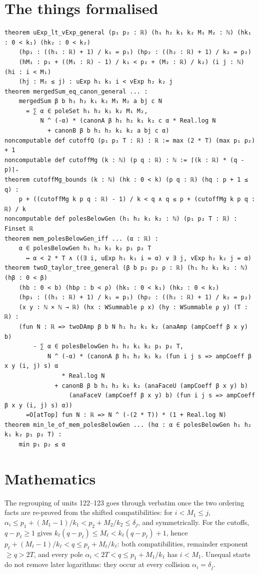 \documentclass[11pt]{article}
\begin{document}
\section{The things formalised}
{\small
\begin{verbatim}
theorem uExp_lt_vExp_general (p₁ p₂ : ℝ) (h₁ h₂ k₁ k₂ M₁ M₂ : ℕ) (hk₁ : 0 < k₁) (hk₂ : 0 < k₂)
    (hp₁ : ((h₁ : ℝ) + 1) / k₁ = p₁) (hp₂ : ((h₂ : ℝ) + 1) / k₂ = p₂)
    (hM₁ : p₁ + ((M₁ : ℝ) - 1) / k₁ < p₂ + (M₂ : ℝ) / k₂) (i j : ℕ) (hi : i < M₁)
    (hj : M₂ ≤ j) : uExp h₁ k₁ i < vExp h₂ k₂ j
theorem mergedSum_eq_canon_general ... :
    mergedSum β b h₁ h₂ k₁ k₂ M₁ M₂ a bj c N
      = ∑ α ∈ poleSet h₁ h₂ k₁ k₂ M₁ M₂,
          N ^ (-α) * (canonA β h₁ h₂ k₁ k₂ c α * Real.log N
            + canonB β b h₁ h₂ k₁ k₂ a bj c α)
noncomputable def cutoffQ (p₁ p₂ T : ℝ) : ℝ := max (2 * T) (max p₁ p₂) + 1
noncomputable def cutoffMg (k : ℕ) (p q : ℝ) : ℕ := ⌈(k : ℝ) * (q - p)⌉₊
theorem cutoffMg_bounds (k : ℕ) (hk : 0 < k) (p q : ℝ) (hq : p + 1 ≤ q) :
    p + ((cutoffMg k p q : ℝ) - 1) / k < q ∧ q ≤ p + (cutoffMg k p q : ℝ) / k
noncomputable def polesBelowGen (h₁ h₂ k₁ k₂ : ℕ) (p₁ p₂ T : ℝ) : Finset ℝ
theorem mem_polesBelowGen_iff ... (α : ℝ) :
    α ∈ polesBelowGen h₁ h₂ k₁ k₂ p₁ p₂ T
      ↔ α < 2 * T ∧ ((∃ i, uExp h₁ k₁ i = α) ∨ ∃ j, vExp h₂ k₂ j = α)
theorem twoD_taylor_tree_general (β b p₁ p₂ ρ : ℝ) (h₁ h₂ k₁ k₂ : ℕ) (hβ : 0 < β)
    (hb : 0 < b) (hbρ : b < ρ) (hk₁ : 0 < k₁) (hk₂ : 0 < k₂)
    (hp₁ : ((h₁ : ℝ) + 1) / k₁ = p₁) (hp₂ : ((h₂ : ℝ) + 1) / k₂ = p₂)
    (x y : ℕ × ℕ → ℝ) (hx : WSummable ρ x) (hy : WSummable ρ y) (T : ℝ) :
    (fun N : ℝ => twoDAmp β b N h₁ h₂ k₁ k₂ (anaAmp (ampCoeff β x y) b)
        - ∑ α ∈ polesBelowGen h₁ h₂ k₁ k₂ p₁ p₂ T,
            N ^ (-α) * (canonA β h₁ h₂ k₁ k₂ (fun i j s => ampCoeff β x y (i, j) s) α
                * Real.log N
              + canonB β b h₁ h₂ k₁ k₂ (anaFaceU (ampCoeff β x y) b)
                  (anaFaceV (ampCoeff β x y) b) (fun i j s => ampCoeff β x y (i, j) s) α))
      =O[atTop] fun N : ℝ => N ^ (-(2 * T)) * (1 + Real.log N)
theorem min_le_of_mem_polesBelowGen ... (hα : α ∈ polesBelowGen h₁ h₂ k₁ k₂ p₁ p₂ T) :
    min p₁ p₂ ≤ α
\end{verbatim}
}

\section{Mathematics}

The regrouping of units 122--123 goes through verbatim once the two ordering facts are re-proved
from the shifted compatibilities: for $i<M_1\le j$, $\alpha_i\le p_1+(M_1-1)/k_1<p_2+M_2/k_2\le\delta_j$,
and symmetrically. For the cutoffs, $q-p_\ell\ge1$ gives $k_\ell(q-p_\ell)\le M_\ell<k_\ell(q-p_\ell)+1$,
hence $p_\ell+(M_\ell-1)/k_\ell<q\le p_\ell+M_\ell/k_\ell$: both compatibilities, remainder exponent
$\ge q>2T$, and every pole $\alpha_i<2T<q\le p_1+M_1/k_1$ has $i<M_1$. Unequal starts do not remove
later logarithms: they occur at every collision $\alpha_i=\delta_j$.
\end{document}
